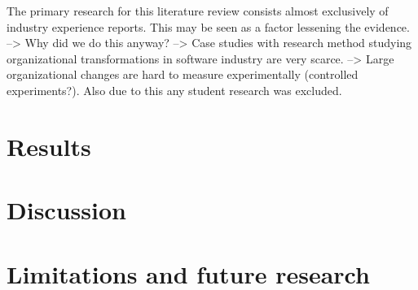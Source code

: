 \documentclass[preprint,authoryear,12pt]{elsarticle}
\begin{document}
The primary research for this literature review consists almost exclusively of
industry experience reports. This may be seen as a factor lessening the
evidence.
--> Why did we do this anyway?
--> Case studies with research method studying organizational transformations in
    software industry are very scarce.
--> Large organizational changes are hard to measure experimentally (controlled
    experiments?). Also due to this any student research was excluded.

\section{Results}
\label{sec:results}


\section{Discussion}
\label{sec:discussion}


\section{Limitations and future research}
\label{sec:conclusion}






\end{document}
